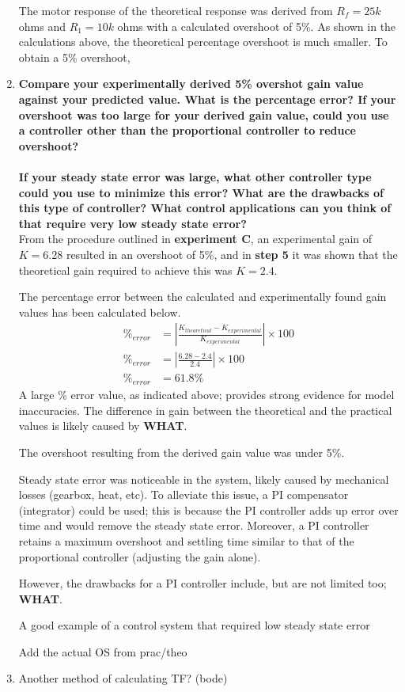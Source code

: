 \documentclass[11pt,a4paper]{article}
\begin{document}
\begin{enumerate}
	The motor response of the theoretical response was derived from $R_f = 25k$ ohms and $R_1 = 10k$ ohms with a calculated overshoot of 5\%. As shown in the calculations above, the theoretical percentage overshoot is much smaller. To obtain a 5\% overshoot, \\

    

    \pagebreak
	\item \textbf{Compare your experimentally derived 5\% overshot gain value against your predicted value. What is the percentage error? If your overshoot was too large for your derived gain value, could you use a controller other than the proportional controller to reduce overshoot? \\\\
If your steady state error was large, what other controller type could you use to minimize this error? What are  the drawbacks of  this  type of controller? What control applications can you think of that require very low steady state error?}\\

From the procedure outlined in \textbf{experiment C}, an experimental gain of $K = 6.28$ resulted in an overshoot of 5\%, and in \textbf{step 5} it was shown that the theoretical gain required to achieve this was $K = 2.4$.

The percentage error between the calculated and experimentally found gain values has been calculated below.
\begin{align*}
\%_{error} &= |\frac{K_{theoretical} - K_{experimental}}{K_{experimental}}| \times 100 \\
\%_{error} &= |\frac{6.28 - 2.4}{2.4}| \times 100 \\
\%_{error} &= 61.8\% 
\end{align*}
A large \% error value, as indicated above; provides strong evidence for model inaccuracies. The difference in gain between the theoretical and the practical values is likely caused by \textbf{WHAT}. 

The overshoot resulting from the derived gain value was under 5\%. 

Steady state error was noticeable in the system, likely caused by mechanical losses (gearbox, heat, etc). To alleviate this issue, a PI compensator (integrator) could be used; this is because the PI controller adds up error over time and would remove the steady state error. Moreover, a PI controller retains a maximum overshoot and settling time similar to that of the proportional controller (adjusting the gain alone). 

However, the drawbacks for a PI controller include, but are not limited too; \textbf{WHAT}.

A good example of a control system that required low steady state error

Add the actual OS from prac/theo \\

    
    
    
    
    
    
    
	\item Another method of calculating TF? (bode)
\end{enumerate}
\end{document}
